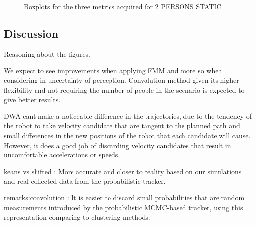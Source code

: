 \begin{figure}[t!]
%
\hspace{0.1cm}
%

\caption{Boxplots for the three metrics acquired for 2 PERSONS STATIC}
\label{fig:boxplots_2people}
\end{figure}


\subsection{Discussion}
\label{sec:discussion}

Reasoning about the figures.

We expect to see improvements when applying FMM and more so when considering in uncertainty of perception. Convolution method given its higher flexibility and not requiring the number of people in the scenario is expected to give better results.

DWA cant make a noticeable difference in the trajectories, due to the tendency of the robot to take velocity candidate that are tangent to the planned path and small differences in the new positions of the robot that each candidate will cause. However, it does a good job of discarding velocity candidates that result in uncomfortable accelerations or speeds.


keans vs shifted : 
 More accurate and closer to reality based on our simulations and real collected data from the probabilistic tracker.
 
remarks:convolution : It is easier to discard small probabilities that are random measurements introduced by the probabilistic MCMC-based tracker, using this representation comparing to clustering methods.
